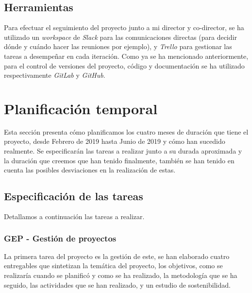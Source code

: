 \subsection{Herramientas}

Para efectuar el seguimiento del proyecto junto a mi director y co-director, se ha utilizado un \textit{workspace} de \textit{Slack} para las comunicaciones directas (para decidir dónde y cuándo hacer las reuniones por ejemplo), y \textit{Trello} para gestionar las tareas a desempeñar en cada iteración. Como ya se ha mencionado anteriormente, para el control de versiones del proyecto, código y documentación se ha utilizado respectivamente \textit{GitLab} y \textit{GitHub}.


\section{Planificación temporal}
\label{sec:planificacion}

Esta sección presenta cómo planificamos los cuatro meses de duración que tiene el proyecto, desde Febrero de 2019 hasta Junio de 2019 y cómo han sucedido realmente. Se especificarán las tareas a realizar junto a su durada aproximada y la duración que creemos que han tenido finalmente, también se han tenido en cuenta las posibles desviaciones en la realización de estas.

\subsection{Especificación de las tareas}

Detallamos a continuación las tareas a realizar.

\subsubsection{GEP - Gestión de proyectos}

La primera tarea del proyecto es la gestión de este, se han elaborado cuatro entregables que sintetizan la temática del proyecto, los objetivos, como se realizaría cuando se planificó y como se ha realizado, la metodología que se ha seguido, las actividades que se han realizado, y un estudio de sostenibilidad.

